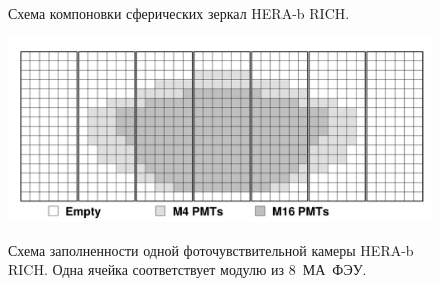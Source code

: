 \begin{figure}[H]
\begin{minipage}[b]{0.545\textwidth}
\caption{Схема компоновки сферических зеркал HERA-b RICH.}
\label{fig:HERAbRICHmirrors}
\includegraphics[width=1.0\textwidth]{pictures/HERAb_camera.png}
\caption{Схема заполненности одной фоточувствительной камеры HERA-b RICH. Одна ячейка соответствует модулю из 8~МА~ФЭУ.}
\label{fig:HERAbRICHcamera}
\end{minipage}
\end{figure}
